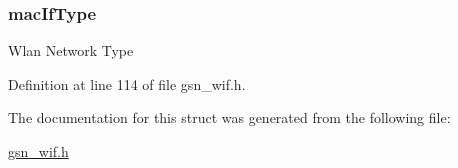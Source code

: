 \hypertarget{a00342_a3ee37b79013f1da93271b12024198eed}{
\subsubsection[{macIfType}]{ {\bf macIfType}}}
\label{a00342_a3ee37b79013f1da93271b12024198eed}
Wlan Network Type 

Definition at line 114 of file gsn\_\-wif.h.



The documentation for this struct was generated from the following file:\begin{DoxyCompactItemize}
\item 
\hyperlink{a00605}{gsn\_\-wif.h}\end{DoxyCompactItemize}
